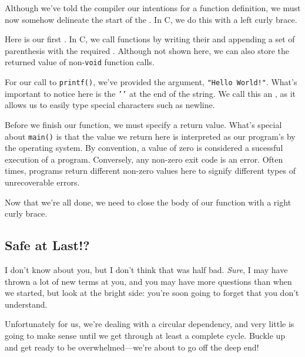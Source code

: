 
\noindent
Although we've told the compiler our intentions for a function
definition, we must now somehow delineate the start of the
.  In C, we do this with a left curly brace.


\noindent
Here is our first .  In C, we call functions by
writing their  and appending a set of parenthesis with
the required .  Although not shown here, we can also
store the returned value of non-\texttt{void} function calls.

For our call to \texttt{printf()}, we've provided the  argument, \texttt{"Hello World!\n"}.  What's
important to notice here is the \texttt{'\n'} at the end of the
string.  We call this an , as it allows us to
easily type special characters such as newline.


\noindent
Before we finish our function, we must specify a return value.  What's
special about \texttt{main()} is that the value we return here is
interpreted as our program's  by the operating system.
By convention, a value of zero is considered a sucessful execution of a
program.  Conversely, any non-zero exit code is an error.  Often times,
programs return different non-zero values here to signify different
types of unrecoverable errors.


\noindent
Now that we're all done, we need to close the body of our function with
a right curly brace.

\subsection{Safe at Last!?}

I don't know about you, but I don't think that was half bad. \emph{%
Sure}, I may have thrown a lot of new terms at you, and you may have
more questions than when we started, but look at the bright side: you're
soon going to forget that you don't understand.

Unfortunately for us, we're dealing with a circular dependency, and very
little is going to make sense until we get through at least a complete
cycle.  Buckle up and get ready to be overwhelmed---we're about to go off
the deep end!
